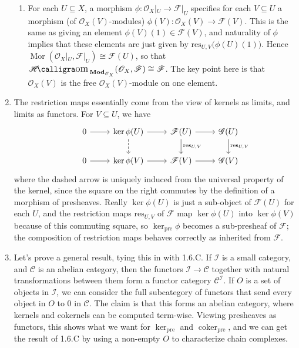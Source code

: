 \documentclass{report}
\newcommand{\cat}[1]{\mathbf{#1}} %
\newcommand{\pre}{{\mathrm{pre}}} %
\newcommand{\res}{{\mathrm{res}}} %
\newcommand{\I}{\mathscr{I}}
\renewcommand{\O}{\mathscr{O}} %
\newcommand{\scrC}{\mathscr{C}}
\newcommand{\scrF}{\mathscr{F}}
\newcommand{\scrG}{\mathscr{G}}
\DeclareMathOperator{\coker}{coker}
\DeclareMathOperator{\Mor}{Mor}
\DeclareMathOperator{\shHom}{\mathscr{H}\text{\kern -3pt {\calligra\large om}}\,}
\begin{document}
\begin{enumerate}[label=\textbf{2.3.\Alph*.}]
\begin{enumerate}[label=(\alph*)]
		      \item For each $U\subseteq X$, a morphism $\phi:\O_X|_U\to\scrF|_U$
		            specifies for each $V\subseteq U$ a morphism (of
		            $\O_X(V)$-modules) $\phi(V):\O_X(V)\to\scrF(V)$. This is the same
		            as giving an element $\phi(V)(1)\in\scrF(V)$, and naturality of
		            $\phi$ implies that these elements are just given by
		            $\res_{U,V}\bigl(\phi(U)(1)\bigr)$. Hence
		            $\Mor(\O_X|_U,\scrF|_U)\cong\scrF(U)$, so that
		            $\shHom_{\cat{Mod}_{\O_X}}(\O_X,\scrF)\cong\scrF$. The key point here
		            is that $\O_X(V)$ is the free $\O_X(V)$-module on one element.
	      \end{enumerate}

	\item The restriction maps essentially come from the view of kernels as
	      limits, and limits as functors. For $V\subseteq U$, we have
	      \begin{equation*}
		      \begin{tikzcd}
			      &0 \arrow{r}
			      &\ker\phi(U)
			      \arrow{r}
			      \arrow[dashed]{d}
			      &\scrF(U)
			      \arrow{r}
			      \arrow{d}{\res_{U,V}}
			      &\scrG(U)
			      \arrow{d}{\res_{U,V}} \\
			      &0 \arrow{r}
			      &\ker\phi(V)
			      \arrow{r}
			      &\scrF(V)
			      \arrow{r}
			      &\scrG(V)
		      \end{tikzcd}
	      \end{equation*}
	      where the dashed arrow is uniquely induced from the universal property
	      of the kernel, since the square on the right commutes by the definition
	      of a morphism of presheaves. Really $\ker\phi(U)$ is just a sub-object
	      of $\scrF(U)$ for each $U$, and the restriction maps $\res_{U,V}$ of $\scrF$
	      map $\ker\phi(U)$ into $\ker\phi(V)$ because of this commuting square,
	      so $\ker_\pre\phi$ becomes a sub-presheaf of $\scrF$; the composition of
	      restriction maps behaves correctly as inherited from $\scrF$.

	\item Let's prove a general result, tying this in with 1.6.C. If $\I$ is a
	      small category, and $\scrC$ is an abelian category, then the functors
	      $\I\to\scrC$ together with natural transformations between them form a
	      functor category $\scrC^\I$. If $O$ is a set of objects in $\I$, we
	      can consider the full subcategory of functors that send every object
	      in $O$ to 0 in $\scrC$. The claim is that this forms an abelian
	      category, where kernels and cokernels can be computed term-wise.
	      Viewing presheaves as functors, this shows what we want for $\ker_\pre$
	      and $\coker_\pre$, and we can get the result of 1.6.C by using a
	      non-empty $O$ to characterize chain complexes.


\end{enumerate}
\end{document}
